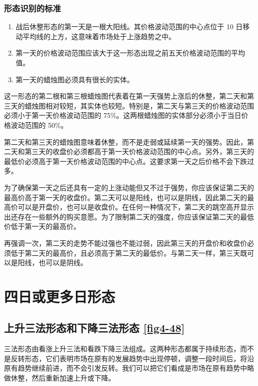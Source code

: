 \subsubsection*{形态识别的标准}
\begin{enumerate}
    \item 战后休整形态的第一天是一根大阳线。其价格波动范围的中心点位于 10 日移动平均线的上方，这意味着市场处于上涨趋势之中。
    \item 第一天的价格波动范围应该大于这一形态出现之前五天价格波动范围的平均值。
    \item 第一天的蜡烛图必须具有很长的实体。
\end{enumerate}


这一形态的第二根和第三根蜡烛图代表着在第一天强势上涨后的休整，第二天和第三天的蜡烛图相对较短，其实体也较短。特别是，第二天与第三天的价格波动范围必须小于第一天价格波动范围的 75\%。这两根蜡烛图的实体部分必须小于当日价格波动范围的 50\%。

第二天和第三天的蜡烛图意味着休整，而不是走弱或延续第一天的强势。因此，第二天和第三天的收盘价必须都高于第一天价格波动范围的中心点。另外，第三天的最低价必须高于第一天价格波动范围的中心点。这要求第一天之后价格不会下跌过多。

为了确保第一天之后还具有一定的上涨动能但又不过于强势，你应该保证第二天的最高价高于第一天的收盘价。第二天可以是阳线，也可以是阴线，因此第二天的最高价可以是开盘价，也可以是收盘价。在任何一种情况下，第二天的跳空高开显示出还存在一些额外的购买意愿。为了限制第二天的强度，你应该保证第二天的最低价低于第一天的最高价。

再强调一次，第二天的走势不能过强也不能过弱，因此第三天的开盘价和收盘价必须低于第二天的最高价，且必须高于第二天的最低价。与第二天一样，第三天既可以是阳线，也可以是阴线。

\section{四日或更多日形态}
\subsection{上升三法形态和下降三法形态 \autoref{fig4-48}}
三法形态由看涨上升三法和看跌下降三法组成。这两种形态都属于持续形态，而不是反转形态，它们表明市场在原有的发展趋势中出现停顿，调整一段时间后，将沿原有趋势继续前进，而不会引发反转。我们可以把它们看成是市场在原有趋势中略做休整，然后重新加速上升或下降。


